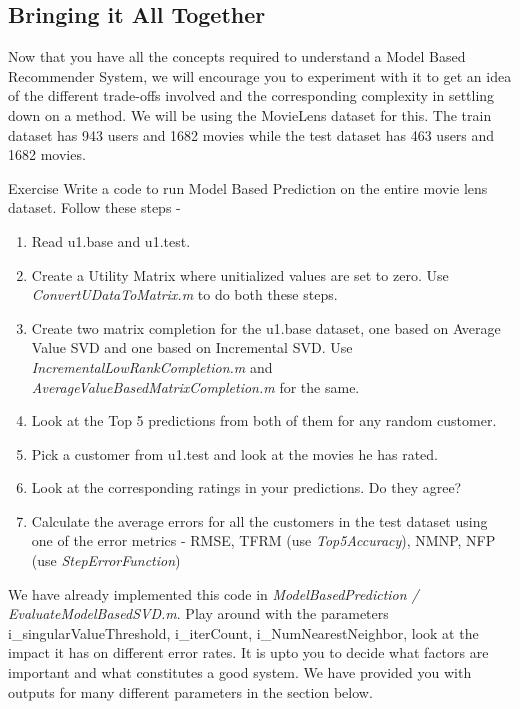   \subsection{Bringing it All Together}
  Now that you have all the concepts required to understand a Model Based Recommender System, we will encourage you to experiment with it to get an idea of the different trade-offs involved and the corresponding complexity in settling down on a method. We will be using the MovieLens dataset for this. The train dataset has 943 users and 1682 movies while the test dataset has 463 users and 1682 movies. 
\begin{myremark}{Exercise }
Write a code to run Model Based Prediction on the entire movie lens dataset. Follow these steps - 
\begin{enumerate}
\item Read u1.base and u1.test. 
\item Create a Utility Matrix where unitialized values are set to zero. Use \textit{ConvertUDataToMatrix.m} to do both these steps.
\item Create two matrix completion for the u1.base dataset, one based on Average Value SVD and one based on Incremental SVD. Use \textit{IncrementalLowRankCompletion.m} and \textit{AverageValueBasedMatrixCompletion.m} for the same.
\item Look at the Top 5 predictions from both of them for any random customer.
\item Pick a customer from u1.test and look at the movies he has rated. 
\item Look at the corresponding ratings in your predictions. Do they agree?
\item Calculate the average errors for all the customers in the test dataset using one of the error metrics - RMSE, TFRM (use \textit{Top5Accuracy}), NMNP, NFP (use \textit{StepErrorFunction})
\end{enumerate}
We have already implemented this code in \textit{ModelBasedPrediction / EvaluateModelBasedSVD.m}. Play around with the parameters {i\_singularValueThreshold, i\_iterCount, i\_NumNearestNeighbor}, look at the impact it has on different error rates. It is upto you to decide what factors are important and what constitutes a good system. We have provided you with outputs for many different parameters in the section below.
\end{myremark}


